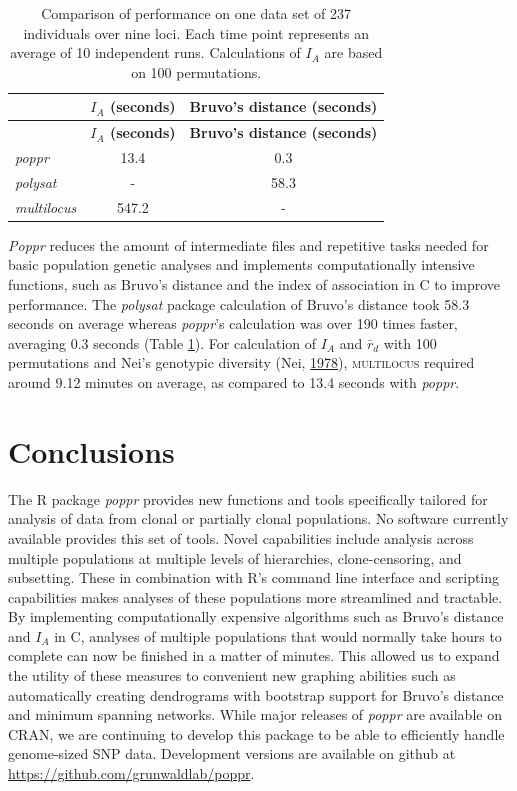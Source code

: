 \documentclass[double,11pt]{beavtex}
\begin{document}
  \begin{longtable}[]{@{}lcc@{}}
  \caption{\label{tab:poppr6} Comparison of performance on one data set of 237
  individuals over nine loci. Each time point represents an average of 10
  independent runs. Calculations of \(I_A\) are based on 100
  permutations.}\tabularnewline
  \toprule
  & \textbf{\(I_A\) (seconds)} & \textbf{Bruvo's distance
  (seconds)}\tabularnewline
  \midrule
  \endfirsthead
  \toprule
  & \textbf{\(I_A\) (seconds)} & \textbf{Bruvo's distance
  (seconds)}\tabularnewline
  \midrule
  \endhead
  \emph{poppr} & 13.4 & 0.3\tabularnewline
  \emph{polysat} & - & 58.3\tabularnewline
  \emph{multilocus} & 547.2 & -\tabularnewline
  \bottomrule
  \end{longtable}
  
  \emph{Poppr} reduces the amount of intermediate files and repetitive
  tasks needed for basic population genetic analyses and implements
  computationally intensive functions, such as Bruvo's distance and the
  index of association in C to improve performance. The \emph{polysat}
  package calculation of Bruvo's distance took 58.3 seconds on average
  whereas \emph{poppr}'s calculation was over 190 times faster, averaging
  0.3 seconds (Table \ref{tab:poppr6}). For calculation of \(I_A\) and
  \(\bar{r}_d\) with 100 permutations and Nei's genotypic diversity (Nei,
  \protect\hyperlink{ref-Nei:1978}{1978}), \textsc{multilocus} required
  around 9.12 minutes on average, as compared to 13.4 seconds with
  \emph{poppr}.
  
  \section{Conclusions}\label{conclusions}
  
  The R package \emph{poppr} provides new functions and tools specifically
  tailored for analysis of data from clonal or partially clonal
  populations. No software currently available provides this set of tools.
  Novel capabilities include analysis across multiple populations at
  multiple levels of hierarchies, clone-censoring, and subsetting. These
  in combination with R's command line interface and scripting
  capabilities makes analyses of these populations more streamlined and
  tractable. By implementing computationally expensive algorithms such as
  Bruvo's distance and \(I_A\) in C, analyses of multiple populations that
  would normally take hours to complete can now be finished in a matter of
  minutes. This allowed us to expand the utility of these measures to
  convenient new graphing abilities such as automatically creating
  dendrograms with bootstrap support for Bruvo's distance and minimum
  spanning networks. While major releases of \emph{poppr} are available on
  CRAN, we are continuing to develop this package to be able to
  efficiently handle genome-sized SNP data. Development versions are
  available on github at \url{https://github.com/grunwaldlab/poppr}.
  
\end{document}
